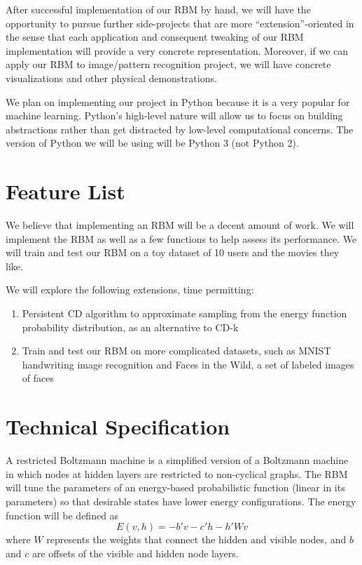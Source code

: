 \documentclass[12pt]{article}
\begin{document}
After successful implementation of our RBM by hand, we will have the opportunity to pursue further side-projects that are more ``extension''-oriented in the sense that each application and consequent tweaking of our RBM implementation will provide a very concrete representation. Moreover, if we can apply our RBM to image/pattern recognition project, we will have concrete visualizations and other physical demonstrations. 

We plan on implementing our project in Python because it is a very popular for machine learning. Python's high-level nature will allow us to focus on building abstractions rather than get distracted by low-level computational concerns. The version of Python we will be using will be Python 3 (not Python 2).

\section{Feature List}

We believe that implementing an RBM will be a decent amount of work. We will implement the RBM as well as a few functions to help assess its performance. We will train and test our RBM on a toy dataset of 10 users and the movies they like. 

We will explore the following extensions, time permitting:
\begin{enumerate}
  \item Persistent CD algorithm to approximate sampling from the energy function probability distribution, as an alternative to CD-k
  \item Train and test our RBM on more complicated datasets, such as MNIST handwriting image recognition and Faces in the Wild, a set of labeled images of faces
\end{enumerate}

\section{Technical Specification}

A restricted Boltzmann machine is a simplified version of a Boltzmann machine in which nodes at hidden layers are restricted to non-cyclical graphs. The RBM will tune the parameters of an energy-based probabilistic function (linear in its parameters) so that desirable states have lower energy configurations. The energy function will be defined as 
$$
E(v,h) = -b'v - c'h -h'Wv
$$ 
where $W$ represents the weights that connect the hidden and visible nodes, and $b$ and $c$ are offsets of the visible and hidden node layers.
\end{document}
